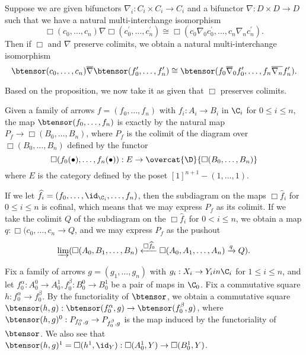 \begin{prop} Suppose we are given bifunctors \(\nabla_i:C_i \times C_i \to C_i\) and a bifunctor \(\nabla:D\times D\to D\) such that we have a natural multi-interchange isomorphism \[\Box(c_0,\dots,c_n)\nabla \Box(c^\prime_0,\dots, c^\prime_n) \cong \Box(c_0\nabla_0 c^\prime_0,\dots,c_n\nabla_n c^\prime_n).\]  Then if \(\Box\) and \(\nabla\) preserve colimits, we obtain a natural multi-interchange isomorphism \[\btensor(c_0,\dots,c_n)\overline{\nabla} \btensor(f^\prime_0,\dots, f^\prime_n) \cong \btensor(f_0\overline{\nabla}_0 f^\prime_0,\dots,f_n\overline{\nabla_n} f^\prime_n).\]
\end{prop}

Based on the proposition, we now take it as given that \(\Box\) preserves colimits.

\begin{obs}Given a family of arrows \(f=(f_0,\dots,f_n)\) with \(f_i:A_i\to B_i\) in \(\C_i\) for \(0\leq i\leq n\), the map \(\btensor(f_0,\dots,f_n)\) is exactly by the natural map \(P_f\to \Box(B_0,\dots,B_n)\), where \(P_f\) is the colimit of the diagram over \(\Box(B_0,\dots,B_n)\) defined by the functor \[\Box(f_0(\bullet),\dots, f_n(\bullet)) :E\to \overcat{\D}{\Box(B_0,\dots,B_n)}\] where \(E\) is the category defined by the poset \([1]^{n+1}-(1,\dots,1)\).  

If we let \(\widehat{f}_i=(f_0,\dots,\id_{\C_i},\dots, f_n)\), then the subdiagram on the maps \(\Box \widehat{f}_i\) for \(0\leq i\leq n\) is cofinal, which means that we may express \(P_f\) as its colimit. If we take the colimit \(Q\) of the subdiagram on the \(\Box \widehat{f}_i\) for \(0<i\leq n\), we obtain a map \(q:\Box(c_0,\dots, c_n\to Q\), and we may express \(P_f\) as the pushout \[\varinjlim(\Box(A_0, B_1, \dots, B_n)\xleftarrow{\Box \widehat{f}_0} \Box(A_0, A_1, \dots, A_n) \xrightarrow{q} Q) .\]  
\end{obs}

Fix a family of arrows \(g=(g_1,\dots, g_n)\) with \(g_i:X_i\to Y_i in \C_i\) for \(1\leq i \leq n\), and let \(f_0^\alpha:A^0_0\to A_0^1 ,f_0^\beta:B_0^0\to B_0^1\) be a pair of maps in \(\C_0\).  Fix a commutative square \(h:f_0^\alpha\to f_0^\beta\).  By the functoriality of \(\btensor\), we obtain a commutative square \(\btensor(h,g):\btensor(f_0^\alpha,g)\to \btensor(f_0^\beta,g)\), where \(\btensor(h,g)^0:P_{f_0^\alpha,g}\to P_{f_0^\beta,g}\) is the map induced by the functoriality of \(\btensor\).  We also see that \(\btensor(h,g)^1=\Box(h^1,\id_Y):\Box(A_0^1,Y) \to \Box(B_0^1,Y)\).  

